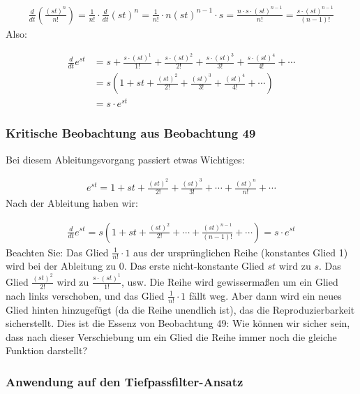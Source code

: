 \documentclass[a4paper, 12pt, twoside, openright]{report}
\theoremstyle{definition}
\theoremstyle{definition}
\begin{document}
\begin{align}
	\frac{d}{dt}\left(\frac{(st)^n}{n!}\right) = \frac{1}{n!} \cdot \frac{d}{dt}(st)^n = \frac{1}{n!} \cdot n(st)^{n-1} \cdot s = \frac{n \cdot s \cdot (st)^{n-1}}{n!} = \frac{s \cdot (st)^{n-1}}{(n-1)!}
\end{align}
Also:

\begin{align}
	\frac{d}{dt} e^{st} &= s + \frac{s \cdot (st)^1}{1!} + \frac{s \cdot (st)^2}{2!} + \frac{s \cdot (st)^3}{3!} + \frac{s \cdot (st)^4}{4!} + \cdots\\
	&= s \left( 1 + st + \frac{(st)^2}{2!} + \frac{(st)^3}{3!} + \frac{(st)^4}{4!} + \cdots \right)\\
	&= s \cdot e^{st}
\end{align}

\subsubsection*{Kritische Beobachtung aus Beobachtung 49}

Bei diesem Ableitungsvorgang passiert etwas Wichtiges: 

\begin{align}
	e^{st} = 1 + st + \frac{(st)^2}{2!} + \frac{(st)^3}{3!} + \cdots + \frac{(st)^n}{n!} + \cdots
\end{align}
Nach der Ableitung haben wir:

\begin{align}
	\frac{d}{dt} e^{st} = s \left( 1 + st + \frac{(st)^2}{2!} + \cdots + \frac{(st)^{n-1}}{(n-1)!} + \cdots \right) = s \cdot e^{st}
\end{align}
Beachten Sie: Das Glied $\frac{1}{n!} \cdot 1$ aus der ursprünglichen Reihe (konstantes Glied 1) wird bei der Ableitung zu 0. Das erste nicht-konstante Glied $st$ wird zu $s$. Das Glied $\frac{(st)^2}{2!}$ wird zu $\frac{s \cdot (st)^1}{1!}$, usw.
Die Reihe wird gewissermaßen um ein Glied nach links verschoben, und das Glied $\frac{1}{n!} \cdot 1$ fällt weg. Aber dann wird ein neues Glied hinten hinzugefügt (da die Reihe unendlich ist), das die Reproduzierbarkeit sicherstellt.
Dies ist die Essenz von Beobachtung 49: Wie können wir sicher sein, dass nach dieser Verschiebung um ein Glied die Reihe immer noch die gleiche Funktion darstellt?

\subsubsection*{Anwendung auf den Tiefpassfilter-Ansatz}
\end{document}
